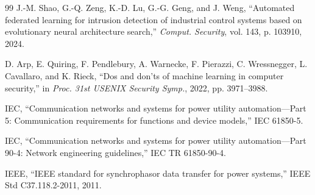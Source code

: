 \documentclass[conference]{IEEEtran}
\begin{document}
\begin{thebibliography}{99}
J.-M. Shao, G.-Q. Zeng, K.-D. Lu, G.-G. Geng, and J. Weng,
``Automated federated learning for intrusion detection of industrial control
systems based on evolutionary neural architecture search,''
\emph{Comput. Security}, vol. 143, p. 103910, 2024.

D. Arp, E. Quiring, F. Pendlebury, A. Warnecke, F. Pierazzi,
C. Wressnegger, L. Cavallaro, and K. Rieck,
``Dos and don'ts of machine learning in computer security,''
in \emph{Proc. 31st USENIX Security Symp.}, 2022,
pp. 3971--3988.

IEC, ``Communication networks and systems for power utility
automation---Part 5: Communication requirements for functions and device
models,'' IEC 61850-5.

IEC, ``Communication networks and systems for power utility
automation---Part 90-4: Network engineering guidelines,''
IEC TR 61850-90-4.

IEEE, ``IEEE standard for synchrophasor data transfer for power systems,''
IEEE Std C37.118.2-2011, 2011.

\end{thebibliography}
\end{document}
